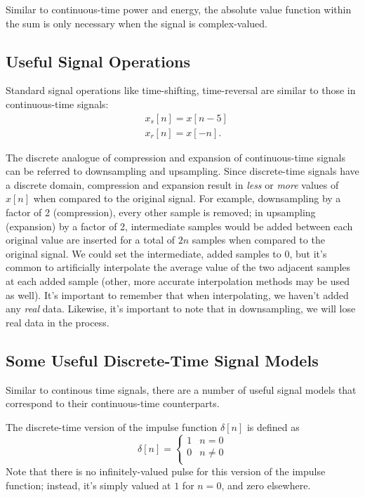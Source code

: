 \documentclass{article}
\begin{document}
Similar to continuous-time power and energy, the absolute value function within the sum is only necessary when the signal is complex-valued.

\subsection{Useful Signal Operations}
Standard signal operations like time-shifting, time-reversal are similar to those in continuous-time signals: 
\begin{align*}
	&x_s[n] = x[n-5] \\
	&x_r[n] = x[-n].
\end{align*}

The discrete analogue of compression and expansion of continuous-time signals can be referred to downsampling and upsampling. Since discrete-time signals have a discrete domain, compression and expansion result in \textit{less} or \textit{more} values of \(x[n]\) when compared to the original signal. For example, downsampling by a factor of 2 (compression), every other sample is removed; in upsampling (expansion) by a factor of 2, intermediate samples would be added between each original value are inserted for a total of \(2n\) samples when compared to the original signal. We could set the intermediate, added samples to 0, but it's common to artificially interpolate the average value of the two adjacent samples at each added sample (other, more accurate interpolation methods may be used as well). It's important to remember that when interpolating, we haven't added any \textit{real} data. Likewise, it's important to note that in downsampling, we will lose real data in the process.  

\subsection{Some Useful Discrete-Time Signal Models}

Similar to continous time signals, there are a number of useful signal models that correspond to their continuous-time counterparts.

The discrete-time version of the impulse function \(\delta[n]\) is defined as 
\[ \delta[n] = 
\begin{cases}
	1&n=0\\
	0&n \neq 0\\
\end{cases}
\]
Note that there is no infinitely-valued pulse for this version of the impulse function; instead, it's simply valued at \(1\) for \(n=0\), and zero elsewhere.
\end{document}
